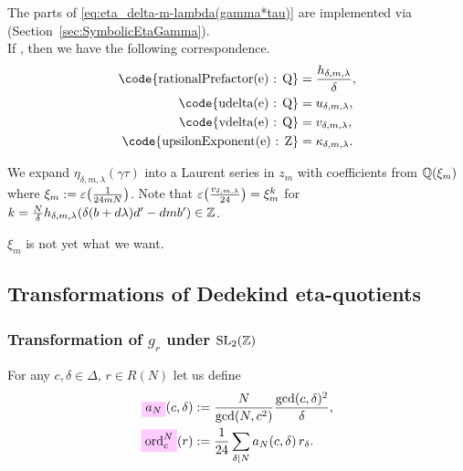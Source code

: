 \documentclass{article}
\begin{document}
The parts of \eqref{eq:eta_delta-m-lambda(gamma*tau)} are implemented
via \textcolor{blue}{}
(Section~\ref{sec:SymbolicEtaGamma}).
\\
If , then we have the
following correspondence.
\begin{align*}
  \text{\code{rationalPrefactor(e) : Q}}
  &=
    \frac{h_{\delta,m,\lambda}}{\delta},
  \\
  \text{\code{udelta(e) : Q}}
  &=
    u_{\delta,m,\lambda},
  \\
  \text{\code{vdelta(e) : Q}}
  &=
    v_{\delta,m,\lambda},
  \\
  \text{\code{upsilonExponent(e) : Z}}
  &=
    \kappa_{\delta,m,\lambda}.
\end{align*}



We expand $\eta_{\delta,m,\lambda}(\gamma \tau)$ into a Laurent series
in $z_m$ with coefficients from $\mathbb{Q}(\xi_m)$ where
$\xi_m := \varepsilon\!\left(\frac{1}{24 m N}\right)$. Note that
$\varepsilon\!\left(\frac{v_{\delta,m,\lambda}}{24}\right)=\xi_m^k$ for
$k=\frac{N}{\delta} h_{\delta,m,\lambda}(\delta (b + d \lambda) d' - d
m b') \in \mathbb{Z}$.
\begin{Hemmecke}
  $\xi_m$ is not yet what we want.
\end{Hemmecke}






\subsection{Transformations of Dedekind eta-quotients}

\subsubsection{Transformation of $g_r$ under $\SL2Z$}
\label{sec:g_r-transformation}

\begin{Definition}
  For any $c, \delta \in\Delta$, $r\in R(N)$ let us define
  \begin{align}
    \defineNotation[a-N]{a_N}(c, \delta)
    &:= \frac{N}{\gcd(N, c^2)} \frac{\gcd(c,\delta)^2}{\delta},
      \notag\\
    \defineNotation[ord-c-N]{\ord_c^N}(r)
    &:= \frac{1}{24}\divisorsum{N} a_N(c, \delta) \, r_\delta.
    \label{eq:order-r}
  \end{align}
\end{Definition}
\end{document}
